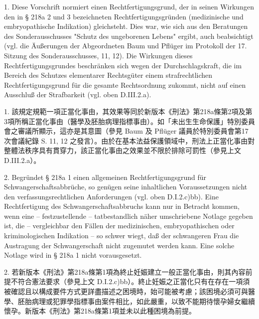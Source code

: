 \documentclass[12pt]{article}
\begin{document}
\begin{sourcepara}[title={原文E.160}]
1. Diese Vorschrift normiert einen Rechtfertigungsgrund, der in seinen Wirkungen den in § 218a \abbrAbs{} 2 und 3 \abbrStGB{} \abbrNF{} bezeichneten Rechtfertigungsgründen (medizinische und embryopathische Indikation) gleichsteht. Dies war, wie sich aus den Beratungen des Sonderausschusses "Schutz des ungeborenen Lebens" ergibt, auch beabsichtigt (vgl. die Äußerungen der Abgeordneten Baum und Pflüger im Protokoll der 17. Sitzung des Sonderausschusses, \abbrS{} 11, 12). Die Wirkungen dieses Rechtfertigungsgrundes beschränken sich wegen der Durchschlagskraft, die im Bereich des Schutzes elementarer Rechtsgüter einem strafrechtlichen Rechtfertigungsgrund für die gesamte Rechtsordnung zukommt, nicht auf einen Ausschluß der Strafbarkeit (vgl. oben D.III.2.a).
\end{sourcepara}
\begin{transpara}
1. 該規定規範一項正當化事由，其效果等同於新版本《刑法》第218a條第2項及第3項所稱正當化事由（醫學及胚胎病理指標事由）。如「未出生生命保護」特別委員會之審議所顯示，這亦是其意圖（參見 Baum 及 Pflüger 議員於特別委員會第17次會議紀錄 S. 11, 12 之發言）。由於在基本法益保護領域中，刑法上正當化事由對整體法秩序具有貫穿力，該正當化事由之效果並不限於排除可罰性（參見上文 D.III.2.a）。
\end{transpara}

\begin{sourcepara}[title={原文E.161}]
2. Begründet § 218a \abbrAbs{} 1 \abbrStGB{} \abbrNF{} einen allgemeinen Rechtfertigungsgrund für Schwangerschaftsabbrüche, so genügen seine inhaltlichen Voraussetzungen nicht den verfassungsrechtlichen Anforderungen (vgl. oben D.I.2.c)bb). Eine Rechtfertigung des Schwangerschaftsabbruchs kann nur in Betracht kommen, wenn eine -- festzustellende -- tatbestandlich näher umschriebene Notlage gegeben ist, die -- vergleichbar den Fällen der medizinischen, embryopathischen oder kriminologischen Indikation -- so schwer wiegt, daß der schwangeren Frau die Austragung der Schwangerschaft nicht zugemutet werden kann. Eine solche Notlage wird in § 218a \abbrAbs{} 1 \abbrStGB{} \abbrNF{} nicht vorausgesetzt.
\end{sourcepara}
\begin{transpara}
2. 若新版本《刑法》第218a條第1項為終止妊娠建立一般正當化事由，則其內容前提不符合憲法要求（參見上文 D.I.2.c)bb）。終止妊娠之正當化只有在存在一項須被確認且以構成要件方式更詳盡描述之困境時，始可能被考慮；該困境必須可與醫學、胚胎病理或犯罪學指標事由案件相比，如此嚴重，以致不能期待懷孕婦女繼續懷孕。新版本《刑法》第218a條第1項並未以此種困境為前提。
\end{transpara}
\end{document}
